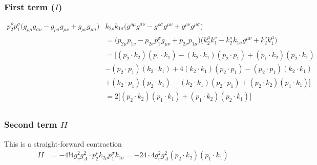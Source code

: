 \documentclass[11pt]{article}
\begin{document}
\subsubsection{First term ($I$)}
\begin{align*} 
 p_2^{\rho} p_1^{\sigma} \big(
g_{\rho \mu} g_{\sigma \nu} - g_{\rho \sigma} g_{\mu \nu} + g_{\rho \nu} g_{\mu \sigma}
\Big)& k_{2\rho} k_{1\sigma}\Big( g^{\rho \mu} g^{\sigma \nu} - g^{\rho \sigma} g^{\mu \nu}
+ g^{\rho \nu} g^{\mu \sigma} \Big)\\
&= \big( p_{2 \mu} p_{1 \nu} - p_{2 \sigma} p_1^{ \sigma} g_{\mu \nu} + p_{2 \nu} p_{1 \mu} \Big)
\Big(k_2^{\mu} k_1^{\nu} - k_2^{\sigma} k_{1 \sigma} g^{\mu \nu} + k_2^{\nu} k_1^{\mu}\Big)\\ &= 
\Big[ (p_2 \cdot k_2) (p_1 \cdot k_1) - (k_2 \cdot k_1) (p_2 \cdot p_1) + (p_1 \cdot k_2) (p_2 \cdot k_1)\\ & - (p_2 \cdot p_1) (k_2 \cdot k_1) 
+ 4(k_2 \cdot k_1) (p_2 \cdot p_1) - (p_2 \cdot p_1) (k_2 \cdot k_1)\\ &  +(k_2 \cdot p_1) (p_2 \cdot k_1)
- (k_2 \cdot k_1) (p_2 \cdot p_1) + (p_2 \cdot k_2) (p_1 \cdot k_1) \Big]\\ 
&= 2 \Big[ (p_2 \cdot k_2) (p_1 \cdot k_1) + (p_1 \cdot k_2) (p_2 \cdot k_1) \Big]\\
\end{align*}

\subsubsection{Second term $II$}
\begin{flushleft}
This is a straight-forward contraction
\begin{align*}
II &= - 4! 4  g_v^2 g_A^2  \cdot
p_2^{\rho}  k_{2 \rho} p_1^{\sigma} k_{1 \sigma} = - 24 \cdot 4 g_v^2 g_A^2 (p_2 \cdot k_2)(p_1 \cdot k_1)
\end{align*}
\end{flushleft}
\end{document}
